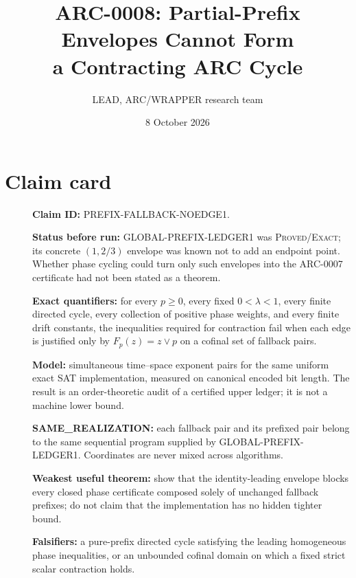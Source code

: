 \documentclass[11pt]{article}
\title{ARC-0008: Partial-Prefix Envelopes Cannot Form\\a Contracting ARC Cycle}
\author{LEAD, ARC/WRAPPER research team}
\date{8 October 2026}
\begin{document}
\maketitle

\begin{center}
\end{center}

\section{Claim card}
\begin{description}
\item[] \textbf{Claim ID:} PREFIX-FALLBACK-NOEDGE1.
\item[] \textbf{Status before run:} GLOBAL-PREFIX-LEDGER1 was
\textsc{Proved/Exact}; its concrete \((1,2/3)\) envelope was known not to add
an endpoint point.  Whether phase cycling could turn only such envelopes into
the ARC-0007 certificate had not been stated as a theorem.
\item[] \textbf{Exact quantifiers:} for every \(p\ge0\), every fixed
\(0<\lambda<1\), every finite directed cycle, every collection of positive
phase weights, and every finite drift constants, the inequalities required
for contraction fail when each edge is justified only by \(F_p(z)=z\vee p\)
on a cofinal set of fallback pairs.
\item[] \textbf{Model:} simultaneous time--space exponent pairs for the
same uniform exact SAT implementation, measured on canonical encoded bit
length.  The result is an order-theoretic audit of a certified upper ledger;
it is not a machine lower bound.
\item[] \textbf{SAME\_REALIZATION:} each fallback pair and its prefixed pair
belong to the same sequential program supplied by GLOBAL-PREFIX-LEDGER1.
Coordinates are never mixed across algorithms.
\item[] \textbf{Weakest useful theorem:} show that the identity-leading
envelope blocks every closed phase certificate composed solely of unchanged
fallback prefixes; do not claim that the implementation has no hidden tighter
bound.
\item[] \textbf{Falsifiers:} a pure-prefix directed cycle satisfying the
leading homogeneous phase inequalities, or an unbounded cofinal domain on
which a fixed strict scalar contraction holds.
\end{description}
\end{document}
